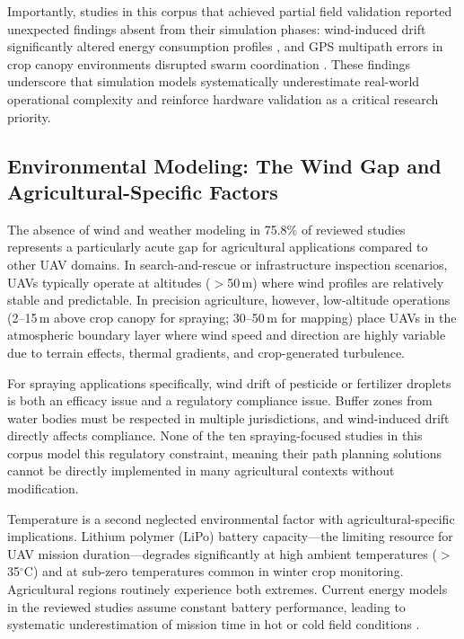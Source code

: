 \documentclass[review,3p,times]{elsarticle}
\begin{document}
Importantly, studies in this corpus that achieved partial field validation reported unexpected findings absent from their simulation phases: wind-induced drift significantly altered energy consumption profiles \cite{liu2021}, and GPS multipath errors in crop canopy environments disrupted swarm coordination \cite{pan2022}. These findings underscore that simulation models systematically underestimate real-world operational complexity and reinforce hardware validation as a critical research priority.

\subsection{Environmental Modeling: The Wind Gap and Agricultural-Specific Factors}
\label{sec:envmodel}

The absence of wind and weather modeling in 75.8\% of reviewed studies represents a particularly acute gap for agricultural applications compared to other UAV domains. In search-and-rescue or infrastructure inspection scenarios, UAVs typically operate at altitudes ($>$50\,m) where wind profiles are relatively stable and predictable. In precision agriculture, however, low-altitude operations (2--15\,m above crop canopy for spraying; 30--50\,m for mapping) place UAVs in the atmospheric boundary layer where wind speed and direction are highly variable due to terrain effects, thermal gradients, and crop-generated turbulence.

For spraying applications specifically, wind drift of pesticide or fertilizer droplets is both an efficacy issue and a regulatory compliance issue. Buffer zones from water bodies must be respected in multiple jurisdictions, and wind-induced drift directly affects compliance. None of the ten spraying-focused studies in this corpus model this regulatory constraint, meaning their path planning solutions cannot be directly implemented in many agricultural contexts without modification.

Temperature is a second neglected environmental factor with agricultural-specific implications. Lithium polymer (LiPo) battery capacity---the limiting resource for UAV mission duration---degrades significantly at high ambient temperatures ($>$35$^\circ$C) and at sub-zero temperatures common in winter crop monitoring. Agricultural regions routinely experience both extremes. Current energy models in the reviewed studies assume constant battery performance, leading to systematic underestimation of mission time in hot or cold field conditions \cite{aitsaadi2022}.
\end{document}
